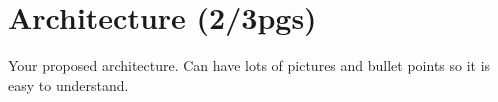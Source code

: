 
% 
% 

\section{Architecture (2/3pgs)}
\label{sec:architecture}
Your proposed architecture. Can have lots of pictures and bullet points so it is easy to understand.

